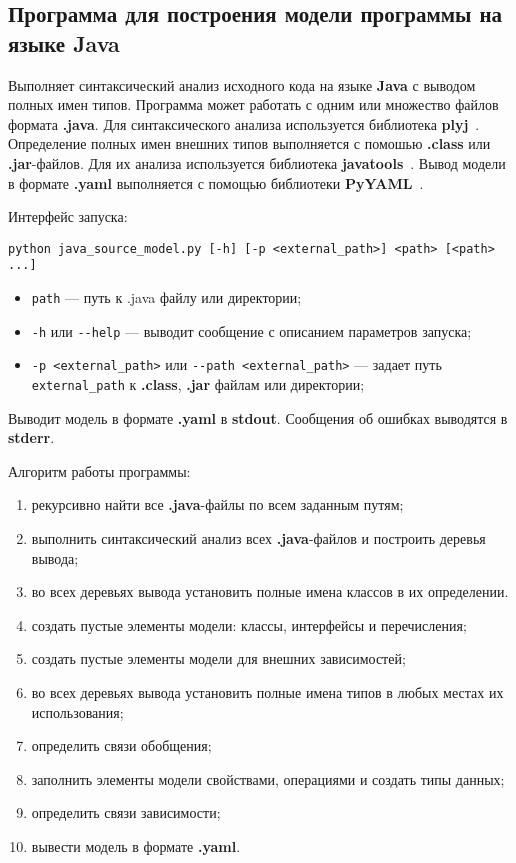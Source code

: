 \subsection{Программа для построения модели программы на языке Java}

Выполняет синтаксический анализ исходного кода на языке \textbf{Java} с выводом
полных имен типов.
Программа может работать с одним или множество файлов формата \textbf{.java}.
Для синтаксического анализа используется библиотека \textbf{plyj}~\cite{plyj}.
Определение полных имен внешних типов выполняется с помошью \textbf{.class} или
\textbf{.jar}-файлов.
Для их анализа используется библиотека \textbf{javatools}~\cite{javatools}.
Вывод модели в формате \textbf{.yaml} выполняется с помощью библиотеки
\textbf{PyYAML}~\cite{PyYAML}.

Интерфейс запуска:
\begin{verbatim}
python java_source_model.py [-h] [-p <external_path>] <path> [<path> ...]
\end{verbatim}

\begin{itemize}
\item \verb;path; --- путь к .java файлу или директории;
\item \verb;-h; или \verb;--help; --- выводит сообщение с описанием параметров
запуска;
\item \verb;-p <external_path>; или \verb;--path <external_path>; --- задает
путь \verb;external_path; к \textbf{.class}, \textbf{.jar} файлам или директории;
\end{itemize}

Выводит модель в формате \textbf{.yaml} в \textbf{stdout}.
Сообщения об ошибках выводятся в \textbf{stderr}.

Алгоритм работы программы:
\begin{enumerate}
\item рекурсивно найти все \textbf{.java}-файлы по всем заданным путям;
\item выполнить синтаксический анализ всех \textbf{.java}-файлов и построить
деревья вывода;
\item во всех деревьях вывода установить полные имена классов в их определении.
\item создать пустые элементы модели: классы, интерфейсы и перечисления;
\item создать пустые элементы модели для внешних зависимостей;
\item во всех деревьях вывода установить полные имена типов в любых местах их
использования;
\item определить связи обобщения;
\item заполнить элементы модели свойствами, операциями и создать типы данных;
\item определить связи зависимости;
\item вывести модель в формате \textbf{.yaml}.
\end{enumerate}

